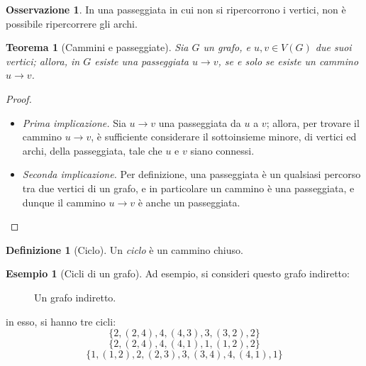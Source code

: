 \documentclass[14pt]{extreport}
\newtheorem{theorem}{Teorema}[subsection]
\theoremstyle{definition}
\newtheorem{definition}{Definizione}[subsection]
\theoremstyle{definition}
\newtheorem{remark}{Osservazione}[subsection]
\newtheorem{example}{Esempio}[subsection]
\begin{document}
\begin{remark}
    In una passeggiata in cui non si ripercorrono i vertici, non è possibile ripercorrere gli archi.
\end{remark}

\begin{theorem}[Cammini e passeggiate]
    \label{cammini e passeggiate}
    Sia $G$ un grafo, e $u, v \in V(G)$ due suoi vertici; allora, in $G$ esiste una passeggiata $u \rightarrow v$, se e solo se esiste un cammino $u \rightarrow v$.
\end{theorem}

\begin{proof}
    \hspace{0.7cm}
    \begin{itemize}
        \item[] \textit{Prima implicazione.} Sia $u \rightarrow v$ una passeggiata da $u$ a $v$; allora, per trovare il cammino $u \rightarrow v$, è sufficiente considerare il sottoinsieme minore, di vertici ed archi, della passeggiata, tale che $u$ e $v$ siano connessi.
        \item[] \textit{Seconda implicazione.} Per definizione, una passeggiata è un qualsiasi percorso tra due vertici di un grafo, e in particolare un cammino è una passeggiata, e dunque il cammino $u \rightarrow v$ è anche un passeggiata.
    \end{itemize}
\end{proof}

\begin{definition}[Ciclo]
    Un \textit{ciclo} è un cammino chiuso.
\end{definition}

\begin{example}[Cicli di un grafo]
    Ad esempio, si consideri questo grafo indiretto:

    \begin{figure}[H]
        \centering
        \caption{Un grafo indiretto.}
    \end{figure}

    in esso, si hanno tre cicli: $$\{2, (2, 4), 4, (4,3), 3, (3, 2), 2\}$$ $$\{2, (2, 4), 4, (4, 1), 1, (1, 2), 2\}$$ $$\{1, (1, 2), 2, (2, 3), 3, (3, 4), 4, (4, 1), 1\}$$
\end{example}
\end{document}
